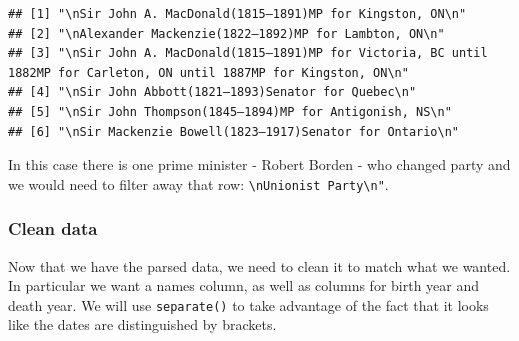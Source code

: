 \documentclass[
]{book}
\newenvironment{Shaded}{\begin{snugshade}}{\end{snugshade}}
\newcommand{\CharTok}[1]{\textcolor[rgb]{0.31,0.60,0.02}{#1}}
\newcommand{\CommentTok}[1]{\textcolor[rgb]{0.56,0.35,0.01}{\textit{#1}}}
\newcommand{\DataTypeTok}[1]{\textcolor[rgb]{0.13,0.29,0.53}{#1}}
\newcommand{\KeywordTok}[1]{\textcolor[rgb]{0.13,0.29,0.53}{\textbf{#1}}}
\newcommand{\NormalTok}[1]{#1}
\newcommand{\OperatorTok}[1]{\textcolor[rgb]{0.81,0.36,0.00}{\textbf{#1}}}
\newcommand{\OtherTok}[1]{\textcolor[rgb]{0.56,0.35,0.01}{#1}}
\newcommand{\StringTok}[1]{\textcolor[rgb]{0.31,0.60,0.02}{#1}}
\begin{document}
\begin{verbatim}
## [1] "\nSir John A. MacDonald(1815–1891)MP for Kingston, ON\n"                                                            
## [2] "\nAlexander Mackenzie(1822–1892)MP for Lambton, ON\n"                                                               
## [3] "\nSir John A. MacDonald(1815–1891)MP for Victoria, BC until 1882MP for Carleton, ON until 1887MP for Kingston, ON\n"
## [4] "\nSir John Abbott(1821–1893)Senator for Quebec\n"                                                                   
## [5] "\nSir John Thompson(1845–1894)MP for Antigonish, NS\n"                                                              
## [6] "\nSir Mackenzie Bowell(1823–1917)Senator for Ontario\n"
\end{verbatim}

In this case there is one prime minister - Robert Borden - who changed party and we would need to filter away that row: \texttt{\textbackslash{}nUnionist\ Party\textbackslash{}n"}.

\hypertarget{clean-data}{%
\subsubsection{Clean data}\label{clean-data}}

Now that we have the parsed data, we need to clean it to match what we wanted. In particular we want a names column, as well as columns for birth year and death year. We will use \texttt{separate()} to take advantage of the fact that it looks like the dates are distinguished by brackets.

\begin{Shaded}
\end{Shaded}
\end{document}
